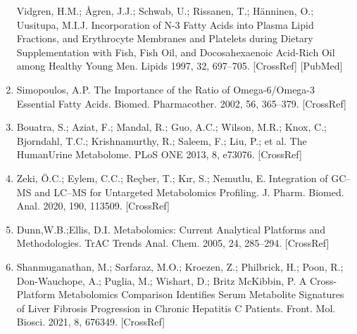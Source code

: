 \documentclass[journal=jacsat,manuscript=article]{achemso}
\begin{document}
\begin{enumerate}
  Vidgren, H.M.; Ågren, J.J.; Schwab, U.; Rissanen, T.; Hänninen, O.;
  Uusitupa, M.I.J. Incorporation of N-3 Fatty Acids into Plasma Lipid
  Fractions, and Erythrocyte Membranes and Platelets during Dietary
  Supplementation with Fish, Fish Oil, and Docosahexaenoic Acid-Rich Oil
  among Healthy Young Men. Lipids 1997, 32, 697--705. {[}CrossRef{]}
  {[}PubMed{]}
\item
  Simopoulos, A.P. The Importance of the Ratio of Omega-6/Omega-3
  Essential Fatty Acids. Biomed. Pharmacother. 2002, 56, 365--379.
  {[}CrossRef{]}
\item
  Bouatra, S.; Aziat, F.; Mandal, R.; Guo, A.C.; Wilson, M.R.; Knox, C.;
  Bjorndahl, T.C.; Krishnamurthy, R.; Saleem, F.; Liu, P.; et al. The
  HumanUrine Metabolome. PLoS ONE 2013, 8, e73076. {[}CrossRef{]}
\item
  Zeki, Ö.C.; Eylem, C.C.; Reçber, T.; Kır, S.; Nemutlu, E. Integration
  of GC--MS and LC--MS for Untargeted Metabolomics Profiling. J. Pharm.
  Biomed. Anal. 2020, 190, 113509. {[}CrossRef{]}
\item
  Dunn,W.B.;Ellis, D.I. Metabolomics: Current Analytical Platforms and
  Methodologies. TrAC Trends Anal. Chem. 2005, 24, 285--294.
  {[}CrossRef{]}
\item
  Shanmuganathan, M.; Sarfaraz, M.O.; Kroezen, Z.; Philbrick, H.; Poon,
  R.; Don-Wauchope, A.; Puglia, M.; Wishart, D.; Britz McKibbin, P. A
  Cross-Platform Metabolomics Comparison Identifies Serum Metabolite
  Signatures of Liver Fibrosis Progression in Chronic Hepatitis C
  Patients. Front. Mol. Biosci. 2021, 8, 676349. {[}CrossRef{]}
\end{enumerate}
\end{document}
